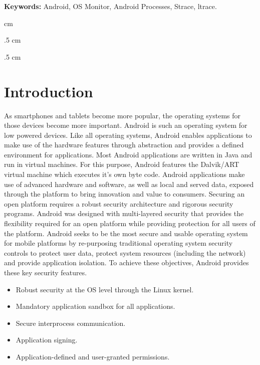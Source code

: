 \documentclass[12pt]{report}
\begin{document}
\textbf{Keywords:} Android, OS Monitor, Android Processes, Strace, ltrace. 

\baselineskip 1cm
\newtheorem{thm}{Theorem}[section]
\newtheorem{cor}[thm]{Corollary}%
\newtheorem{pro}{Proposition}[section]
\newtheorem{lemma}{Lemma}%
\newtheorem{rem}[thm]{Remark}%
\newtheorem{note}[thm]{Note}%
\newtheorem{defn}{Definition}[section]
\newtheorem{con}[thm]{Conjecture}


\newpage
{} cm
\tableofcontents

\newpage
\baselineskip .5 cm
\listoffigures  {}

\newpage
\baselineskip .5 cm
\listoftables  {}


\newpage
\baselineskip 1cm
\setcounter{page}{1}
\clearpage 
\chapter{Introduction}
As smartphones and tablets become more popular, the operating systems for those
devices become more important. Android is such an operating system for low
powered devices. Like all operating systems, Android
enables applications to make use of the hardware features through abstraction and
provides a defined environment for applications.
Most Android applications are written in Java and run in virtual machines. For
this purpose, Android features the Dalvik/ART virtual machine which executes it’s own
byte code. Android applications make use of advanced hardware and software, as well as local and served data, exposed through the platform to bring innovation and value to consumers. Securing an open platform requires a robust security architecture and rigorous security programs. Android was designed with multi-layered security that provides the flexibility required for an open platform while providing protection for all users of the platform. Android seeks to be the most secure and usable operating system for mobile platforms by re-purposing traditional operating system security controls to protect user data, protect system resources (including the network) and provide application isolation. To achieve these objectives, Android provides these key security features.
\begin{itemize}
	\item Robust security at the OS level through the Linux kernel.

	\item Mandatory application sandbox for all applications.

	\item Secure interprocess communication.

	\item Application signing.

	\item Application-defined and user-granted permissions.
\end{itemize}
\end{document}
